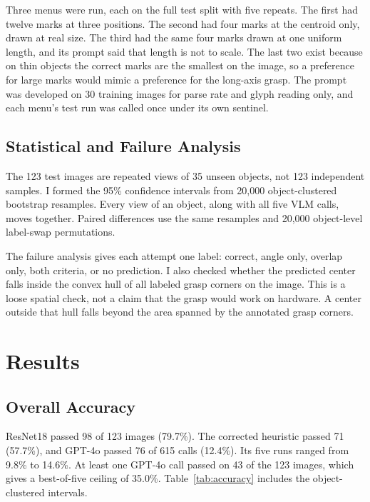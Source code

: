 \documentclass[10pt,conference,compsoc]{IEEEtran}
\begin{document}
Three menus were run, each on the full test split with five repeats. The
first had twelve marks at three positions. The second had four marks at
the centroid only, drawn at real size. The third had the same four marks
drawn at one uniform length, and its prompt said that length is not to
scale. The last two exist because on thin
objects the correct marks are the smallest on the image, so a preference for
large marks would mimic a preference for the long-axis grasp. The prompt was
developed on 30 training images for parse rate and glyph reading only, and
each menu's test run was called once under its own sentinel.

\subsection{Statistical and Failure Analysis}

The 123 test images are repeated views of 35 unseen objects, not 123
independent samples. I formed the 95\% confidence intervals from 20,000
object-clustered bootstrap resamples. Every view of an object, along with all
five VLM calls, moves together. Paired differences use the same resamples and
20,000 object-level label-swap permutations.

The failure analysis gives each attempt one label: correct, angle only,
overlap only, both criteria, or no prediction. I also checked whether the
predicted center falls inside the convex hull of all labeled grasp corners on
the image. This is a loose spatial check, not a claim that the grasp would
work on hardware. A center outside that hull falls beyond the area spanned by
the annotated grasp corners.

\section{Results}

\subsection{Overall Accuracy}

ResNet18 passed 98 of 123 images (79.7\%). The corrected heuristic passed 71
(57.7\%), and GPT-4o passed 76 of 615 calls (12.4\%). Its five runs ranged
from 9.8\% to 14.6\%. At least one GPT-4o call passed on 43 of the 123 images,
which gives a best-of-five ceiling of 35.0\%. Table~\ref{tab:accuracy} includes
the object-clustered intervals.
\end{document}
